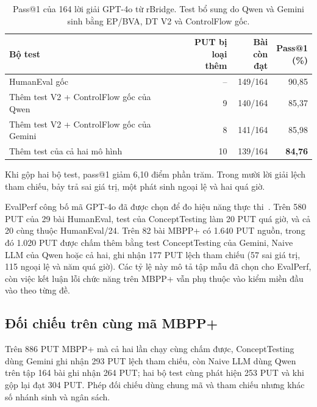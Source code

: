 \begin{table}[!htbp]
\centering
\caption[Pass@1 của cùng 164 lời giải GPT-4o từ rBridge]{Pass@1 của 164 lời giải GPT-4o từ rBridge. Test bổ sung do Qwen và Gemini sinh bằng EP/BVA, DT V2 và ControlFlow gốc.}
\label{tab:gpt4o-rbridge-pass1}
\small
\begin{tabular*}{\linewidth}{@{\extracolsep{\fill}}lrrr@{}}
\toprule
Bộ test & \shortstack[r]{PUT bị loại\\thêm} & \shortstack[r]{Bài còn\\đạt} & \shortstack[r]{Pass@1\\(\%)} \\
\midrule
HumanEval gốc & -- & 149/164 & 90,85 \\
Thêm test V2 + ControlFlow gốc của Qwen & 9 & 140/164 & 85,37 \\
Thêm test V2 + ControlFlow gốc của Gemini & 8 & 141/164 & 85,98 \\
Thêm test của cả hai mô hình & 10 & 139/164 & \textbf{84,76} \\
\bottomrule
\end{tabular*}
\end{table}

Khi gộp hai bộ test, pass@1 giảm 6,10 điểm phần trăm. Trong mười lời giải lệch tham chiếu, bảy trả sai giá trị, một phát sinh ngoại lệ và hai quá giờ.

EvalPerf công bố mã GPT-4o đã được chọn để đo hiệu năng thực thi~\cite{evalperfBenchmark}. Trên 580 PUT của 29 bài HumanEval, test của ConceptTesting làm 20 PUT quá giờ, và cả 20 cùng thuộc HumanEval/24. Trên 82 bài MBPP+ có 1.640 PUT nguồn, trong đó 1.020 PUT được chấm thêm bằng test ConceptTesting của Gemini, Naive LLM của Qwen hoặc cả hai, ghi nhận 177 PUT lệch tham chiếu (57 sai giá trị, 115 ngoại lệ và năm quá giờ). Các tỷ lệ này mô tả tập mẫu đã chọn cho EvalPerf, còn việc kết luận lỗi chức năng trên MBPP+ vẫn phụ thuộc vào kiểm miền đầu vào theo từng đề.

\subsection{Đối chiếu trên cùng mã MBPP+}
\label{sec:mbpp-common-puts}

Trên 886 PUT MBPP+ mà cả hai lần chạy cùng chấm được, ConceptTesting dùng Gemini ghi nhận 293 PUT lệch tham chiếu, còn Naive LLM dùng Qwen trên tập 164 bài ghi nhận 264 PUT; hai bộ test cùng phát hiện 253 PUT và khi gộp lại đạt 304 PUT. Phép đối chiếu dùng chung mã và tham chiếu nhưng khác số nhánh sinh và ngân sách.


